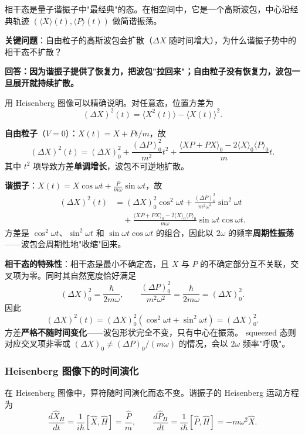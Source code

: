\begin{insightbox}
相干态是量子谐振子中"最经典"的态。在相空间中，它是一个高斯波包，中心沿经典轨迹 $(\langle X\rangle(t), \langle P\rangle(t))$ 做简谐振荡。

\textbf{关键问题}：自由粒子的高斯波包会扩散（$\Delta X$ 随时间增大），为什么谐振子势中的相干态不扩散？

\textbf{回答：因为谐振子提供了恢复力，把波包"拉回来"；自由粒子没有恢复力，波包一旦展开就持续扩散。}

用 Heisenberg 图像可以精确说明。对任意态，位置方差为
\[
(\Delta X)^2(t) = \langle X^2(t)\rangle - \langle X(t)\rangle^2.
\]

\textbf{自由粒子}（$V=0$）：$X(t) = X + Pt/m$，故
\[
(\Delta X)^2(t) = (\Delta X)^2_0 + \frac{(\Delta P)^2_0}{m^2}t^2 + \frac{\langle XP+PX\rangle_0 - 2\langle X\rangle_0\langle P\rangle_0}{m}t.
\]
其中 $t^2$ 项导致方差\textbf{单调增长}，波包不可逆地扩散。

\textbf{谐振子}：$X(t) = X\cos\omega t + \frac{P}{m\omega}\sin\omega t$，故
\begin{align*}
(\Delta X)^2(t)
&= (\Delta X)^2_0\cos^2\omega t + \frac{(\Delta P)^2_0}{m^2\omega^2}\sin^2\omega t \\
&\quad + \frac{\langle XP+PX\rangle_0 - 2\langle X\rangle_0\langle P\rangle_0}{m\omega}\sin\omega t\cos\omega t.
\end{align*}
方差是 $\cos^2\omega t$、$\sin^2\omega t$ 和 $\sin\omega t\cos\omega t$ 的组合，因此以 $2\omega$ 的频率\textbf{周期性振荡}——波包会周期性地"收缩"回来。

\textbf{相干态的特殊性}：相干态是最小不确定态，且 $X$ 与 $P$ 的不确定部分互不关联，交叉项为零。同时其自然宽度恰好满足
\[
(\Delta X)^2_0 = \frac{\hbar}{2m\omega},
\qquad
\frac{(\Delta P)^2_0}{m^2\omega^2} = \frac{\hbar}{2m\omega} = (\Delta X)^2_0.
\]
因此
\[
(\Delta X)^2(t) = (\Delta X)^2_0(\cos^2\omega t + \sin^2\omega t) = (\Delta X)^2_0.
\]
方差\textbf{严格不随时间变化}——波包形状完全不变，只有中心在振荡。 squeezed 态则对应交叉项非零或 $(\Delta X)_0\neq (\Delta P)_0/(m\omega)$ 的情况，会以 $2\omega$ 频率"呼吸"。
\end{insightbox}
\subsubsection{Heisenberg 图像下的时间演化}

在 Heisenberg 图像中，算符随时间演化而态不变。谐振子的 Heisenberg 运动方程为
\[
\frac{d\hat{X}_H}{dt} = \frac{1}{i\hbar}[\hat{X}, \hat{H}] = \frac{\hat{P}}{m},
\qquad
\frac{d\hat{P}_H}{dt} = \frac{1}{i\hbar}[\hat{P}, \hat{H}] = -m\omega^2\hat{X}.
\]

